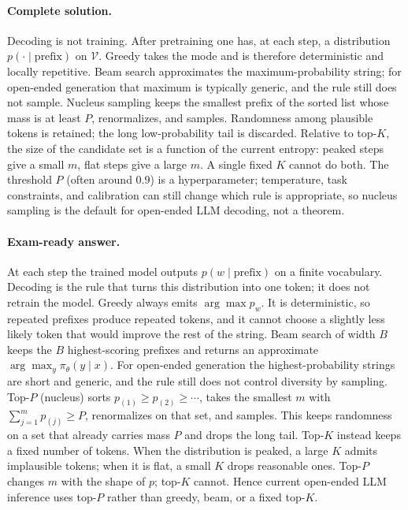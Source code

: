 \documentclass[11pt,a4paper]{article}
\theoremstyle{definition}
\begin{document}
\paragraph{Complete solution.}
Decoding is not training. After pretraining one has, at each step, a distribution \(p(\cdot\mid\text{prefix})\) on \(\mathcal{V}\). Greedy takes the mode and is therefore deterministic and locally repetitive. Beam search approximates the maximum-probability string; for open-ended generation that maximum is typically generic, and the rule still does not sample. Nucleus sampling keeps the smallest prefix of the sorted list whose mass is at least \(P\), renormalizes, and samples. Randomness among plausible tokens is retained; the long low-probability tail is discarded. Relative to top-\(K\), the size of the candidate set is a function of the current entropy: peaked steps give a small \(m\), flat steps give a large \(m\). A single fixed \(K\) cannot do both. The threshold \(P\) (often around \(0.9\)) is a hyperparameter; temperature, task constraints, and calibration can still change which rule is appropriate, so nucleus sampling is the default for open-ended LLM decoding, not a theorem.

\paragraph{Exam-ready answer.}
At each step the trained model outputs \(p(w\mid\text{prefix})\) on a finite vocabulary. Decoding is the rule that turns this distribution into one token; it does not retrain the model. Greedy always emits \(\arg\max p_w\). It is deterministic, so repeated prefixes produce repeated tokens, and it cannot choose a slightly less likely token that would improve the rest of the string. Beam search of width \(B\) keeps the \(B\) highest-scoring prefixes and returns an approximate \(\arg\max_y\pi_\theta(y\mid x)\). For open-ended generation the highest-probability strings are short and generic, and the rule still does not control diversity by sampling. Top-\(P\) (nucleus) sorts \(p_{(1)}\ge p_{(2)}\ge\cdots\), takes the smallest \(m\) with \(\sum_{j=1}^{m}p_{(j)}\ge P\), renormalizes on that set, and samples. This keeps randomness on a set that already carries mass \(P\) and drops the long tail. Top-\(K\) instead keeps a fixed number of tokens. When the distribution is peaked, a large \(K\) admits implausible tokens; when it is flat, a small \(K\) drops reasonable ones. Top-\(P\) changes \(m\) with the shape of \(p\); top-\(K\) cannot. Hence current open-ended LLM inference uses top-\(P\) rather than greedy, beam, or a fixed top-\(K\).
\end{document}
